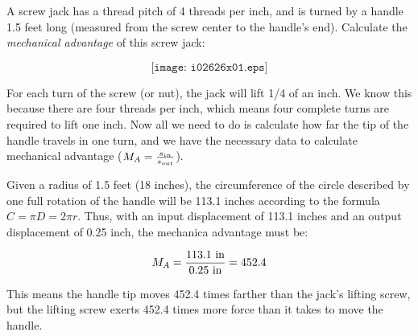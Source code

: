 

A screw jack has a thread pitch of 4 threads per inch, and is turned by a handle 1.5 feet long (measured from the screw center to the handle's end).  Calculate the {\it mechanical advantage} of this screw jack:  

$$\texttt{[image: i02626x01.eps]}$$







For each turn of the screw (or nut), the jack will lift 1/4 of an inch.  We know this because there are four threads per inch, which means four complete turns are required to lift one inch.  Now all we need to do is calculate how far the tip of the handle travels in one turn, and we have the necessary data to calculate mechanical advantage ($M_A = {s_{in} \over s_{out}}$).

\vskip 10pt

Given a radius of 1.5 feet (18 inches), the circumference of the circle described by one full rotation of the handle will be 113.1 inches according to the formula $C = \pi D = 2 \pi r$.  Thus, with an input displacement of 113.1 inches and an output displacement of 0.25 inch, the mechanica advantage must be:

$$M_A = {113.1 \hbox{ in} \over 0.25 \hbox{ in}} = 452.4$$

This means the handle tip moves 452.4 times farther than the jack's lifting screw, but the lifting screw exerts 452.4 times more force than it takes to move the handle.











